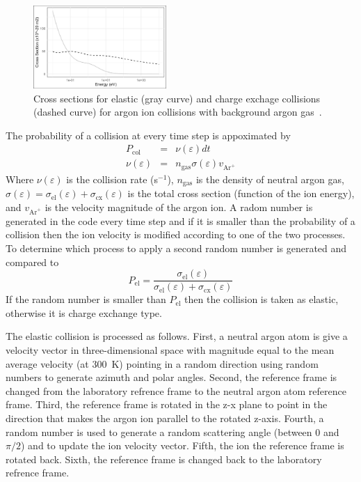 \begin{figure}[htbp]
\centering
\includegraphics[width=0.45\textwidth]{Figures/CrossSections.jpg}
\caption{Cross sections for elastic (gray curve) and charge exchage collisions (dashed curve) for argon ion collisions with background argon gas~\cite{Phelps1994,LXCat}.}
\label{fig:CrossSectionsArgon}
\end{figure}

The probability of a collision at every time step is appoximated by
\begin{eqnarray}
P_{\text{col}} &=& \nu(\varepsilon) dt  \\
\nu(\varepsilon) &=& n_{\text{gas}} \sigma(\varepsilon) v_{\text{Ar}^+}
\end{eqnarray}
Where $\nu(\varepsilon)$ is the collision rate (s$^{-1}$), $n_{\text{gas}}$ is the density of neutral argon gas, $\sigma(\varepsilon) = \sigma_{\text{el}}(\varepsilon) + \sigma_{\text{cx}}(\varepsilon)$ is the total cross section (function of the ion energy), and $v_{\text{Ar}^+}$ is the velocity magnitude of the argon ion. A radom number is generated in the code every time step and if it is smaller than the probability of a collision then the ion velocity is modified according to one of the two processes. To determine which process to apply a second random number is generated and compared to 
\begin{equation}
P_{\text{el}} = \frac{\sigma_{\text{el}}(\varepsilon)}{\sigma_{\text{el}}(\varepsilon) + \sigma_{\text{cx}}(\varepsilon)}
\end{equation}
If the random number is smaller than $P_{\text{el}}$ then the collision is taken as elastic, otherwise it is charge exchange type. 

The elastic collision is processed as follows. First, a neutral argon atom is give a velocity vector in three-dimensional space  with magnitude equal to the mean average velocity (at 300~K) pointing in a random direction using random numbers to generate azimuth and polar angles. Second, the reference frame is changed from the laboratory refrence frame to the neutral argon atom reference frame. Third, the reference frame is rotated in the z-x plane to point in the direction that makes the argon ion parallel to the rotated z-axis. Fourth, a random number is used to generate a random scattering angle (between 0 and $\pi/2$) and to update the ion velocity vector. Fifth, the ion the reference frame is rotated back. Sixth, the reference frame is changed back to the laboratory refrence frame.

